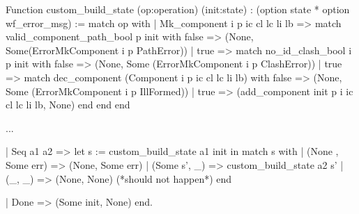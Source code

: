 Function custom_build_state (op:operation) (init:state) : (option state * option wf_error_msg) :=
 match op with
   | Mk_component i p ic cl lc li lb => 
           match valid_component_path_bool p init with
              false  => (None, Some(ErrorMkComponent i p PathError))
            | true   => match no_id_clash_bool i p init with
                            false => (None, Some (ErrorMkComponent i p ClashError))
                          | true  => match dec_component (Component i p ic cl lc li lb) with
                                       false => (None, Some (ErrorMkComponent i p IllFormed))
                                     | true  => (add_component init p i ic cl lc li lb, None)
                                     end
                          end
              end

    ...
    
    | Seq          a1 a2              =>
       let s := custom_build_state a1 init in
       match s with
         | (None , Some err)    => (None, Some err)
         | (Some s', _)  => custom_build_state a2 s'
         | (_, _)          => (None, None) (*should not happen*)
       end
       
    | Done                            => (Some init, None)
  end.